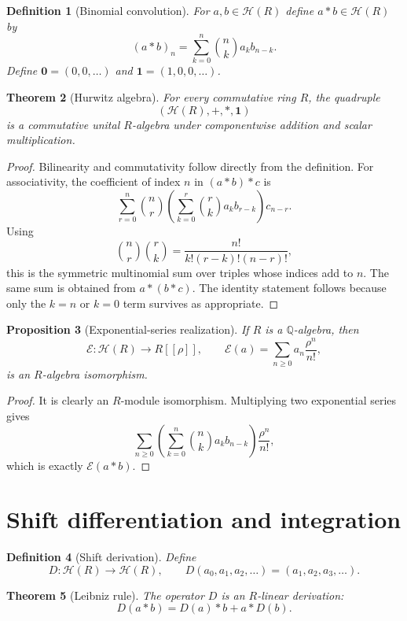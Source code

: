 \documentclass[11pt]{article}
\newtheorem{theorem}{Theorem}[section]
\newtheorem{proposition}[theorem]{Proposition}
\newtheorem{definition}[theorem]{Definition}
\newcommand{\Hurs}{\mathcal H}
\newcommand{\Q}{\mathbb Q}
\begin{document}
\begin{definition}[Binomial convolution]
For $a,b\in\Hurs(R)$ define $a*b\in\Hurs(R)$ by
\[
(a*b)_n=\sum_{k=0}^{n}\binom{n}{k}a_k b_{n-k}.
\]
Define $\mathbf 0=(0,0,\ldots)$ and $\mathbf 1=(1,0,0,\ldots)$.
\end{definition}

\begin{theorem}[Hurwitz algebra]
For every commutative ring $R$, the quadruple
\[
(\Hurs(R),+,*,\mathbf 1)
\]
is a commutative unital $R$-algebra under componentwise addition and scalar multiplication.
\end{theorem}

\begin{proof}
Bilinearity and commutativity follow directly from the definition.  For associativity, the coefficient of index $n$ in $(a*b)*c$ is
\[
\sum_{r=0}^{n}\binom nr\left(\sum_{k=0}^{r}\binom rk a_k b_{r-k}\right)c_{n-r}.
\]
Using
\[
\binom nr\binom rk=\frac{n!}{k!(r-k)!(n-r)!},
\]
this is the symmetric multinomial sum over triples whose indices add to $n$.  The same sum is obtained from $a*(b*c)$.  The identity statement follows because only the $k=n$ or $k=0$ term survives as appropriate.
\end{proof}

\begin{proposition}[Exponential-series realization]
If $R$ is a $\Q$-algebra, then
\[
\mathcal E:\Hurs(R)\longrightarrow R[[\rho]],\qquad
\mathcal E(a)=\sum_{n\ge0}a_n\frac{\rho^n}{n!},
\]
is an $R$-algebra isomorphism.
\end{proposition}

\begin{proof}
It is clearly an $R$-module isomorphism.  Multiplying two exponential series gives
\[
\sum_{n\ge0}\left(\sum_{k=0}^{n}\binom nk a_kb_{n-k}\right)\frac{\rho^n}{n!},
\]
which is exactly $\mathcal E(a*b)$.
\end{proof}

\section{Shift differentiation and integration}

\begin{definition}[Shift derivation]
Define
\[
D:\Hurs(R)\to\Hurs(R),\qquad
D(a_0,a_1,a_2,\ldots)=(a_1,a_2,a_3,\ldots).
\]
\end{definition}

\begin{theorem}[Leibniz rule]
The operator $D$ is an $R$-linear derivation:
\[
D(a*b)=D(a)*b+a*D(b).
\]
\end{theorem}
\end{document}
